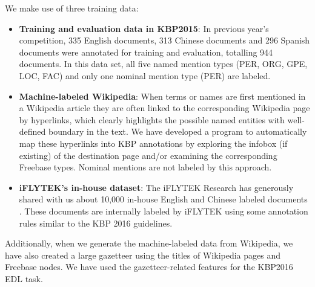 \documentclass[11pt,a4paper]{article}
\begin{document}

We make use of three training data:

\begin{itemize}
	\item \textbf{Training and evaluation data in KBP2015}: In previous year's competition, 335 English documents, 313 Chinese documents and 296 Spanish documents were annotated for training and evaluation, totalling 944 documents. In this data set, all five named mention types (PER, ORG, GPE, LOC, FAC) and only one nominal mention type (PER) are labeled. 
	
	\item \textbf{Machine-labeled Wikipedia}: When terms or names are first mentioned in a Wikipedia article they are often linked to the corresponding Wikipedia page by hyperlinks, which clearly highlights the possible named entities with well-defined boundary in the text. We have developed a program to automatically map these hyperlinks into KBP annotations by exploring the infobox (if existing) of the destination page and/or examining the corresponding Freebase types. Nominal mentions are not labeled by this approach. 
	
	\item \textbf{iFLYTEK's in-house dataset}: The iFLYTEK Research has generously shared with us about 10,000 in-house English and Chinese labeled documents \cite{kbp2016iflytek}.  These documents are internally labeled by iFLYTEK using some annotation rules similar to the KBP 2016 guidelines.
	
\end{itemize}

Additionally, when we generate the machine-labeled data from Wikipedia, we have also created a large gazetteer using the titles of Wikipedia pages and Freebase nodes. 
We have used the gazetteer-related features for the KBP2016 EDL task.

%
\end{document}
